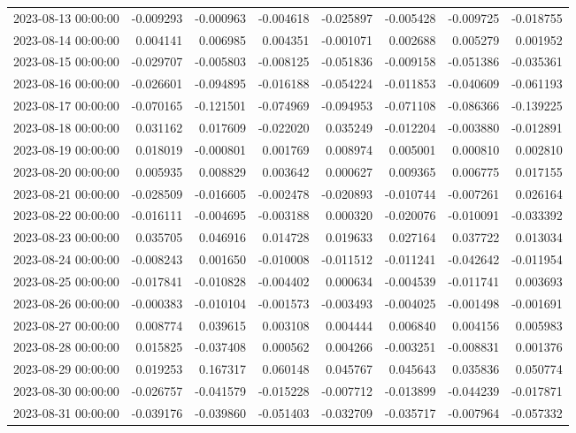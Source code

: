 \begin{tabular}{lrrrrrrr}
2023-08-13 00:00:00 & -0.009293 & -0.000963 & -0.004618 & -0.025897 & -0.005428 & -0.009725 & -0.018755 \\
2023-08-14 00:00:00 & 0.004141 & 0.006985 & 0.004351 & -0.001071 & 0.002688 & 0.005279 & 0.001952 \\
2023-08-15 00:00:00 & -0.029707 & -0.005803 & -0.008125 & -0.051836 & -0.009158 & -0.051386 & -0.035361 \\
2023-08-16 00:00:00 & -0.026601 & -0.094895 & -0.016188 & -0.054224 & -0.011853 & -0.040609 & -0.061193 \\
2023-08-17 00:00:00 & -0.070165 & -0.121501 & -0.074969 & -0.094953 & -0.071108 & -0.086366 & -0.139225 \\
2023-08-18 00:00:00 & 0.031162 & 0.017609 & -0.022020 & 0.035249 & -0.012204 & -0.003880 & -0.012891 \\
2023-08-19 00:00:00 & 0.018019 & -0.000801 & 0.001769 & 0.008974 & 0.005001 & 0.000810 & 0.002810 \\
2023-08-20 00:00:00 & 0.005935 & 0.008829 & 0.003642 & 0.000627 & 0.009365 & 0.006775 & 0.017155 \\
2023-08-21 00:00:00 & -0.028509 & -0.016605 & -0.002478 & -0.020893 & -0.010744 & -0.007261 & 0.026164 \\
2023-08-22 00:00:00 & -0.016111 & -0.004695 & -0.003188 & 0.000320 & -0.020076 & -0.010091 & -0.033392 \\
2023-08-23 00:00:00 & 0.035705 & 0.046916 & 0.014728 & 0.019633 & 0.027164 & 0.037722 & 0.013034 \\
2023-08-24 00:00:00 & -0.008243 & 0.001650 & -0.010008 & -0.011512 & -0.011241 & -0.042642 & -0.011954 \\
2023-08-25 00:00:00 & -0.017841 & -0.010828 & -0.004402 & 0.000634 & -0.004539 & -0.011741 & 0.003693 \\
2023-08-26 00:00:00 & -0.000383 & -0.010104 & -0.001573 & -0.003493 & -0.004025 & -0.001498 & -0.001691 \\
2023-08-27 00:00:00 & 0.008774 & 0.039615 & 0.003108 & 0.004444 & 0.006840 & 0.004156 & 0.005983 \\
2023-08-28 00:00:00 & 0.015825 & -0.037408 & 0.000562 & 0.004266 & -0.003251 & -0.008831 & 0.001376 \\
2023-08-29 00:00:00 & 0.019253 & 0.167317 & 0.060148 & 0.045767 & 0.045643 & 0.035836 & 0.050774 \\
2023-08-30 00:00:00 & -0.026757 & -0.041579 & -0.015228 & -0.007712 & -0.013899 & -0.044239 & -0.017871 \\
2023-08-31 00:00:00 & -0.039176 & -0.039860 & -0.051403 & -0.032709 & -0.035717 & -0.007964 & -0.057332 \\

\end{tabular}
